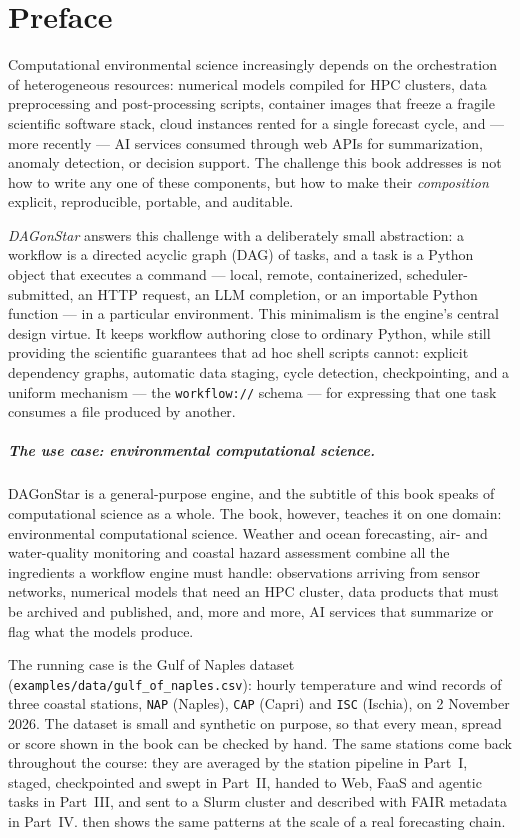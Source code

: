 \chapter*{Preface}

Computational environmental science increasingly depends on the orchestration
of heterogeneous resources: numerical models compiled for HPC clusters, data
preprocessing and post-processing scripts, container images that freeze a
fragile scientific software stack, cloud instances rented for a single
forecast cycle, and --- more recently --- AI services consumed through web
APIs for summarization, anomaly detection, or decision support. The challenge
this book addresses is not how to write any one of these components, but how
to make their \emph{composition} explicit, reproducible, portable, and
auditable.

\emph{DAGonStar} answers this challenge with a deliberately small abstraction:
a workflow is a directed acyclic graph (DAG) of tasks, and a task is a Python
object that executes a command --- local, remote, containerized,
scheduler-submitted, an HTTP request, an LLM completion, or an importable
Python function --- in a particular environment. This minimalism is the
engine's central design virtue. It keeps workflow authoring close to ordinary
Python, while still providing the scientific guarantees that ad hoc shell
scripts cannot: explicit dependency graphs, automatic data staging, cycle
detection, checkpointing, and a uniform mechanism --- the \texttt{workflow://}
schema --- for expressing that one task consumes a file produced by another.

\paragraph{The use case: environmental computational science.}
DAGonStar is a general-purpose engine, and the subtitle of this book speaks of
computational science as a whole. The book, however, teaches it on one
domain: environmental computational science. Weather and ocean forecasting,
air- and water-quality monitoring and coastal hazard assessment combine all
the ingredients a workflow engine must handle: observations arriving from
sensor networks, numerical models that need an HPC cluster, data products
that must be archived and published, and, more and more, AI services that
summarize or flag what the models produce.

The running case is the Gulf of Naples dataset
(\texttt{examples/data/gulf\_of\_naples.csv}): hourly temperature and wind
records of three coastal stations, \texttt{NAP} (Naples), \texttt{CAP}
(Capri) and \texttt{ISC} (Ischia), on 2 November 2026. The dataset is small
and synthetic on purpose, so that every mean, spread or score shown in the book
can be checked by hand. The same stations come back throughout the course:
they are averaged by the station pipeline in Part~I, staged, checkpointed and
swept in Part~II, handed to Web, FaaS and agentic tasks in Part~III, and sent
to a Slurm cluster and described with FAIR metadata in Part~IV.  then
shows the same patterns at the scale of a real forecasting chain.

